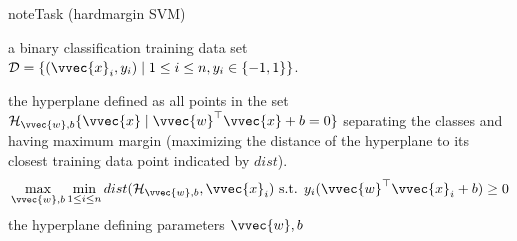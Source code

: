 \documentclass[letterpaper,10pt,english]{jupyterBook}
\begin{document}
\begin{sphinxadmonition}{note}{Task (hard\sphinxhyphen{}margin SVM)}

\sphinxAtStartPar
{} a binary classification training data set \(\mathcal{D}=\{(\vvec{x}_i,y_i)\mid 1\leq i\leq n, y_i\in\{-1,1\}\}\).

\sphinxAtStartPar
{} the hyperplane defined as all points in the set \(\mathcal{H}_{\vvec{w},b}\{\vvec{x}\mid\vvec{w}^\top\vvec{x}+b=0\}\) separating the classes and having maximum margin (maximizing the distance of the hyperplane to its closest training data point indicated by \(dist\)).
\begin{equation*}
\begin{split}\max_{\vvec{w},b}\min_{1\leq i\leq n}dist(\mathcal{H}_{\vvec{w},b},\vvec{x}_i)\text{ s.t. } y_i(\vvec{w}^\top\vvec{x}_i+b)\geq 0\end{split}
\end{equation*}
 the hyperplane defining parameters \(\vvec{w},b\)
\end{sphinxadmonition}
\end{document}
